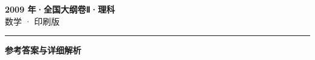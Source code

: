 \documentclass[zihao=5, a4paper]{ctexart}
\begin{document}
\begin{center}
  {\Large\bfseries 2009 年·全国大纲卷Ⅱ·理科}\\[4pt]
  {\large 数学 · 印刷版}
\end{center}
\medskip
{}

\par\bigskip\hrule\bigskip
{}
\begin{center}{\large\bfseries 参考答案与详细解析}\end{center}
\smallskip

\end{document}
